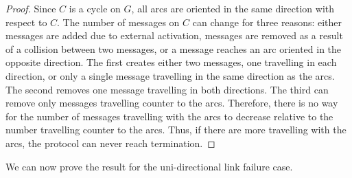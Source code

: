 \begin{proof}
    Since $C$ is a cycle on $G$, all arcs are oriented in the same direction with respect to $C$. 
    The number of messages on $C$ can change for three reasons: either messages are added due to external activation, messages are removed as a result of a collision between two messages, or a message reaches an arc oriented in the opposite direction. 
    The first creates either two messages, one travelling in each direction, or only a single message travelling in the same direction as the arcs. 
    The second removes one message travelling in both directions. 
    The third can remove only messages travelling counter to the arcs. 
    Therefore, there is no way for the number of messages travelling with the arcs to decrease relative to the number travelling counter to the arcs. 
    Thus, if there are more travelling with the arcs, the protocol can never reach termination.
\end{proof}
We can now prove the result for the uni-directional link failure case.

